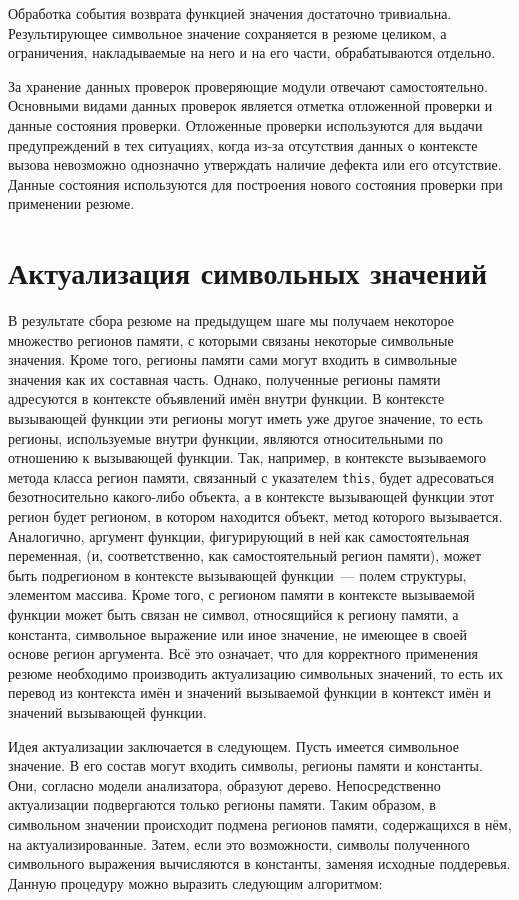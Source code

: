 Обработка события возврата функцией значения достаточно тривиальна. Результирующее символьное значение сохраняется в резюме целиком, а ограничения, накладываемые на него и на его части, обрабатываются отдельно.

За хранение данных проверок проверяющие модули отвечают самостоятельно. Основными видами данных проверок является отметка отложенной проверки и данные состояния проверки. Отложенные проверки используются для выдачи предупреждений в тех ситуациях, когда из-за отсутствия данных о контексте вызова невозможно однозначно утверждать наличие дефекта или его отсутствие. Данные состояния используются для построения нового состояния проверки при применении резюме. 

\section{Актуализация символьных значений}

В результате сбора резюме на предыдущем шаге мы получаем некоторое множество регионов памяти, с которыми связаны некоторые символьные значения. Кроме того, регионы памяти сами могут входить в символьные значения как их составная часть. Однако, полученные регионы памяти адресуются в контексте объявлений имён внутри функции. В контексте вызывающей функции эти регионы могут иметь уже другое значение, то есть регионы, используемые внутри функции, являются относительными по отношению к вызывающей функции. Так, например, в контексте вызываемого метода класса регион памяти, связанный с указателем \texttt{this}, будет адресоваться безотносительно какого-либо объекта, а в контексте вызывающей функции этот регион будет регионом, в котором находится объект, метод которого вызывается. Аналогично, аргумент функции, фигурирующий в ней как самостоятельная переменная, (и, соответственно, как самостоятельный регион памяти), может быть подрегионом в контексте вызывающей функции~--- полем структуры, элементом массива. Кроме того, с регионом памяти в контексте вызываемой функции может быть связан не символ, относящийся к региону памяти, а константа, символьное выражение или иное значение, не имеющее в своей основе регион аргумента. Всё это означает, что для корректного применения резюме необходимо производить актуализацию символьных значений, то есть их перевод из контекста имён и значений вызываемой функции в контекст имён и значений вызывающей функции.

Идея актуализации заключается в следующем. Пусть имеется символьное значение. В его состав могут входить символы, регионы памяти и константы. Они, согласно модели анализатора, образуют дерево. Непосредственно актуализации подвергаются только регионы памяти. Таким образом, в символьном значении происходит подмена регионов памяти, содержащихся в нём, на актуализированные. Затем, если это возможности, символы полученного символьного выражения вычисляются в константы, заменяя исходные поддеревья. Данную процедуру можно выразить следующим алгоритмом:

